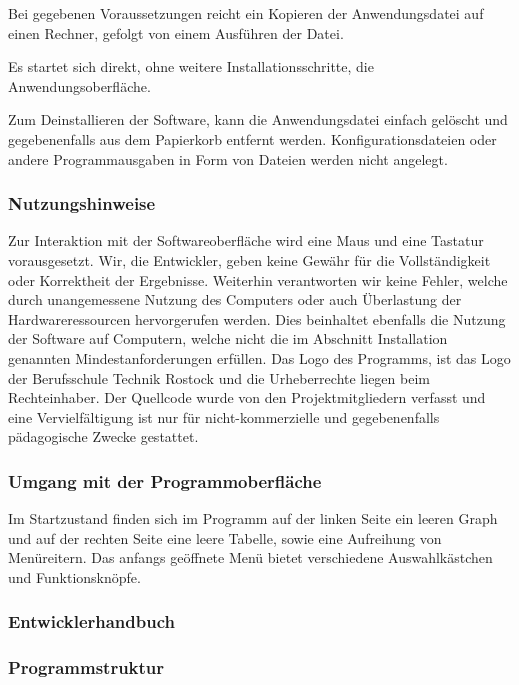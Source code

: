 \documentclass{article}
\begin{document}
    Bei gegebenen Voraussetzungen reicht ein Kopieren der Anwendungsdatei auf einen Rechner, gefolgt von einem Ausführen der Datei.

    Es startet sich direkt, ohne weitere Installationsschritte, die Anwendungsoberfläche.

    Zum Deinstallieren der Software, kann die Anwendungsdatei einfach gelöscht und gegebenenfalls aus dem Papierkorb entfernt werden.
    Konfigurationsdateien oder andere Programmausgaben in Form von Dateien werden nicht angelegt.

    \subsubsection{Nutzungshinweise}
    
    Zur Interaktion mit der Softwareoberfläche wird eine Maus und eine Tastatur vorausgesetzt.
    Wir, die Entwickler, geben keine Gewähr für die Vollständigkeit oder Korrektheit der Ergebnisse.
    Weiterhin verantworten wir keine Fehler, welche durch unangemessene Nutzung des Computers oder auch Überlastung der Hardwareressourcen hervorgerufen werden.
    Dies beinhaltet ebenfalls die Nutzung der Software auf Computern, welche nicht die im Abschnitt Installation genannten Mindestanforderungen erfüllen.
    Das Logo des Programms, ist das Logo der Berufsschule Technik Rostock und die Urheberrechte liegen beim Rechteinhaber.
    Der Quellcode wurde von den Projektmitgliedern verfasst und eine Vervielfältigung ist nur für nicht-kommerzielle und gegebenenfalls pädagogische Zwecke gestattet.

    \subsubsection{Umgang mit der Programmoberfläche}
    
    Im Startzustand finden sich im Programm auf der linken Seite ein leeren Graph und auf der rechten Seite eine leere Tabelle, sowie eine Aufreihung von Menüreitern.
    Das anfangs geöffnete Menü bietet verschiedene Auswahlkästchen und Funktionsknöpfe.
    

\subsubsection{Entwicklerhandbuch}
    \subsubsection{Programmstruktur}
    
\end{document}
